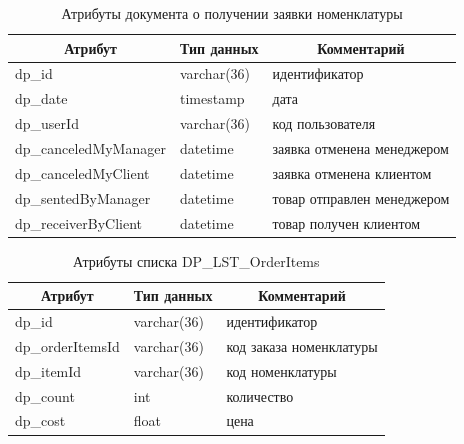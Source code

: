 \begin{table}[!htb]
    \centering\small

    \caption{Атрибуты документа о получении заявки номенклатуры}
    \label{tab:DP_DOC_OrderItems}

    \begin{tabular}{|p{5cm}|p{2.5cm}|p{9cm}|}
        \hline
        \multicolumn{1}{|c|}{Атрибут}
        & \multicolumn{1}{c|}{Тип данных}
        & \multicolumn{1}{c|}{Комментарий}
        \\ \hline

        dp\_id & varchar(36) & идентификатор \\ \hline
        dp\_date & timestamp & дата \\ \hline
        dp\_userId & varchar(36) & код пользователя \\ \hline
        dp\_canceledMyManager & datetime & заявка отменена менеджером \\ \hline
        dp\_canceledMyClient & datetime & заявка отменена клиентом \\ \hline
        dp\_sentedByManager & datetime & товар отправлен менеджером \\ \hline
        dp\_receiverByClient & datetime & товар получен клиентом \\ \hline
    \end{tabular}
\end{table}

\begin{table}[!htb]
    \centering\small

    \caption{Атрибуты списка DP\_LST\_OrderItems}
    \label{tab:DP_LST_OrderItems}

    \begin{tabular}{|p{5cm}|p{2.5cm}|p{9cm}|}
        \hline
        \multicolumn{1}{|c|}{Атрибут}
        & \multicolumn{1}{c|}{Тип данных}
        & \multicolumn{1}{c|}{Комментарий}
        \\ \hline

        dp\_id & varchar(36) & идентификатор \\ \hline
        dp\_orderItemsId & varchar(36) & код заказа номенклатуры \\ \hline
        dp\_itemId & varchar(36) & код номенклатуры \\ \hline
        dp\_count & int & количество \\ \hline
        dp\_cost & float & цена \\ \hline
    \end{tabular}
\end{table}

